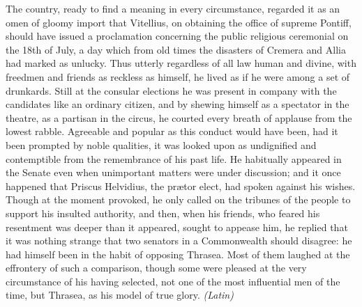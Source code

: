 The country, ready to find a meaning in every circumstance, regarded it as an omen of gloomy import that Vitellius, on obtaining the office of supreme Pontiff, should have issued a proclamation concerning the public religious ceremonial on the 18th of July, a day which from old times the disasters of Cremera and Allia had marked as unlucky. Thus utterly regardless of all law human and divine, with freedmen and friends as reckless as himself, he lived as if he were among a set of drunkards. Still at the consular elections he was present in company with the candidates like an ordinary citizen, and by shewing himself as a spectator in the theatre, as a partisan in the circus, he courted every breath of applause from the lowest rabble. Agreeable and popular as this conduct would have been, had it been prompted by noble qualities, it was looked upon as undignified and contemptible from the remembrance of his past life. He habitually appeared in the Senate even when unimportant matters were under discussion; and it once happened that Priscus Helvidius, the prætor elect, had spoken against his wishes. Though at the moment provoked, he only called on the tribunes of the people to support his insulted authority, and then, when his friends, who feared his resentment was deeper than it appeared, sought to appease him, he replied that it was nothing strange that two senators in a Commonwealth should disagree: he had himself been in the habit of opposing Thrasea. Most of them laughed at the effrontery of such a comparison, though some were pleased at the very circumstance of his having selected, not one of the most influential men of the time, but Thrasea, as his model of true glory. \emph{(Latin)}



